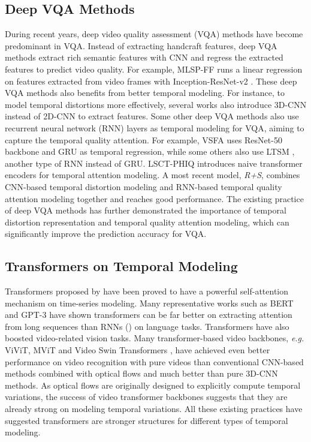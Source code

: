 \documentclass[journal]{IEEEtran}
\begin{document}
\subsection{Deep VQA Methods}
During recent years, deep video quality assessment (VQA) methods have become predominant in VQA. Instead of extracting handcraft features, deep VQA methods \cite{gstvqa, vsfa, mlsp} extract rich semantic features with CNN and regress the extracted features to predict video quality. For example, MLSP-FF \cite{mlsp} runs a linear regression on features extracted from video frames with Inception-ResNet-v2 \cite{irnv2}. These deep VQA methods also benefits from better temporal modeling. For instance, to model temporal distortions more effectively, several works \cite{cnn+lstm, pvq, rfugc} also introduce 3D-CNN instead of 2D-CNN to extract features. Some other deep VQA methods also use recurrent neural network (RNN) layers as temporal modeling for VQA, aiming to capture the temporal quality attention. For example, VSFA \cite{vsfa} uses ResNet-50 backbone \cite{he2016residual} and GRU \cite{gru} as temporal regression, while some others \cite{cnn+lstm, rfugc} also use LTSM \cite{lstm}, another type of RNN instead of GRU. LSCT-PHIQ\cite{lsctphiq} introduces naive transformer encoders for temporal attention modeling. A most recent model, \textit{R+S}\cite{bvqa2022}, combines CNN-based temporal distortion modeling and RNN-based temporal quality attention modeling together and reaches good performance. The existing practice of deep VQA methods has further demonstrated the importance of temporal distortion representation and temporal quality attention modeling, which can significantly improve the prediction accuracy for VQA.

\subsection{Transformers on Temporal Modeling}

Transformers proposed by \cite{allyouneed} have been proved to have a powerful self-attention mechanism on time-series modeling. Many representative works such as BERT\cite{bert} and GPT-3\cite{gpt} have shown transformers can be far better on extracting attention from long sequences than RNNs (\cite{gru,lstm}) on language tasks. Transformers have also boosted video-related vision tasks. Many  transformer-based video backbones, \textit{e.g.} ViViT\cite{vivit}, MViT\cite{mvit} and Video Swin Transformers \cite{swin3d}, have achieved even better performance on video recognition with pure videos than conventional CNN-based methods combined with optical flows and much better than pure 3D-CNN methods. As optical flows are originally designed to explicitly compute temporal variations, the success of video transformer backbones suggests that they are already strong on modeling temporal variations. All these existing practices have suggested transformers are stronger structures for different types of temporal modeling.
\end{document}
